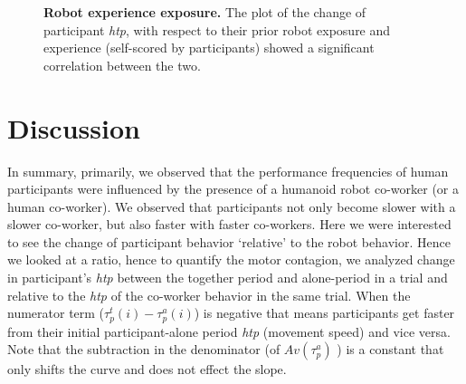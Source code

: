 \begin{figure}[hpt]
	\caption{{\bf Robot experience exposure.} The plot of the change of participant {\it htp}, with respect to their prior robot exposure and experience (self-scored by participants) showed a significant correlation between the two.}
	\label{fig:corelation}
\end{figure}



\section{Discussion}
In summary, primarily, we observed that the performance frequencies of human participants were influenced by the presence of a humanoid robot co-worker (or a human co-worker). We observed that participants not only become slower with a slower co-worker, but also faster with faster co-workers. Here we were interested to see the change of participant behavior `relative' to the robot behavior. Hence we looked at a ratio, hence to quantify the motor contagion, we analyzed change in participant's \textit{htp} between the together period and alone-period in a trial and relative to the {\it htp} of the co-worker behavior in the same trial. When the numerator term ($\tau_p^t(i)-\tau_p^a(i)$) is negative that means participants get faster from their initial participant-alone period \textit{htp} (movement speed) and vice versa. Note that the subtraction in the denominator (of $Av(\tau_p^a)$ ) is a constant that only shifts the curve and does not effect the slope.  

